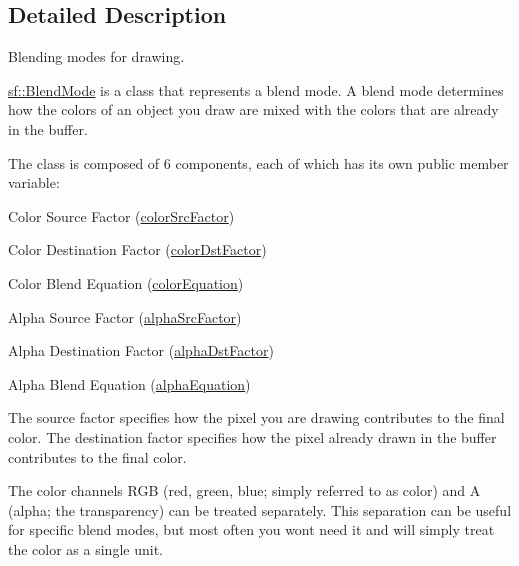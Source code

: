 \subsection{Detailed Description}
Blending modes for drawing. 

\begin{DoxyVerb}\end{DoxyVerb}


\mbox{\hyperlink{structsf_1_1_blend_mode}{sf\+::\+Blend\+Mode}} is a class that represents a blend mode. A blend mode determines how the colors of an object you draw are mixed with the colors that are already in the buffer.

The class is composed of 6 components, each of which has its own public member variable\+: \begin{DoxyItemize}
\item Color Source Factor (\mbox{\hyperlink{structsf_1_1_blend_mode_a32d1a55dbfada86a06d9b881dc8ccf7b}{color\+Src\+Factor}}) \item Color Destination Factor (\mbox{\hyperlink{structsf_1_1_blend_mode_adee68ee59e7f1bf71d12db03d251104d}{color\+Dst\+Factor}}) \item Color Blend Equation (\mbox{\hyperlink{structsf_1_1_blend_mode_aed12f06eb7f50a1b95b892b0964857b1}{color\+Equation}}) \item Alpha Source Factor (\mbox{\hyperlink{structsf_1_1_blend_mode_aa94e44f8e1042a7357e8eff78c61a1be}{alpha\+Src\+Factor}}) \item Alpha Destination Factor (\mbox{\hyperlink{structsf_1_1_blend_mode_aaf85b6b7943181cc81745569c4851e4e}{alpha\+Dst\+Factor}}) \item Alpha Blend Equation (\mbox{\hyperlink{structsf_1_1_blend_mode_a68f5a305e0912946f39ba6c9265710c4}{alpha\+Equation}})\end{DoxyItemize}
The source factor specifies how the pixel you are drawing contributes to the final color. The destination factor specifies how the pixel already drawn in the buffer contributes to the final color.

The color channels R\+GB (red, green, blue; simply referred to as color) and A (alpha; the transparency) can be treated separately. This separation can be useful for specific blend modes, but most often you won\textquotesingle{}t need it and will simply treat the color as a single unit.

